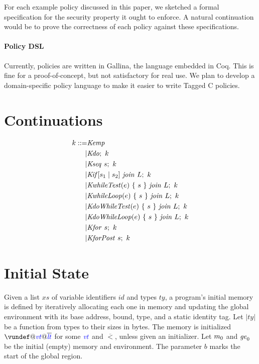 \documentclass[acmsmall,review,anonymous]{acmart}\settopmatter{printfolios=true,printccs=false,printacmref=false}
\begin{document}
For each example policy discussed in this paper, we sketched a formal specification for the
security property it ought to enforce. A natural continuation would be to prove the correctness
of each policy against these specifications.

\paragraph{Policy DSL}

Currently, policies are written in Gallina, the language embedded in Coq. This is fine for a
proof-of-concept, but not satisfactory for real use. We plan to develop a domain-specific policy
language to make it easier to write Tagged C policies.



\appendix

\section{Continuations}
\label{app:continuations}

\[\begin{split}
k ::= & \mathit{Kemp} \\
| & \mathit{Kdo};~ k \\
| & \mathit{Kseq} ~ s; ~ k \\
| & \mathit{Kif}[s_1 \mid s_2] ~ \mathit{join} ~ L; ~ k \\
| & \mathit{KwhileTest}(e) ~ \{ ~ s ~ \} ~ \mathit{join} ~ L; ~ k \\
| & \mathit{KwhileLoop}(e) ~ \{ ~ s ~ \} ~ \mathit{join} ~ L; ~ k \\
| & \mathit{KdoWhileTest}(e) ~ \{ ~ s ~ \} ~ \mathit{join} ~ L; ~ k \\
| & \mathit{KdoWhileLoop}(e) ~ \{ ~ s ~ \} ~ \mathit{join} ~ L; ~ k \\
| & \mathit{Kfor} ~ s; ~ k \\
| & \mathit{KforPost} ~ s; ~ k \\
\end{split}\]

\section{Initial State}

Given a list \(xs\) of variable identifiers \(id\) and types
\(ty\), a program's initial memory is defined by iteratively allocating each one
in memory and updating the global environment with its base address, bound, type,
and a static identity tag. Let \(|ty|\) be a function from types to their sizes
in bytes. The memory is initialized \(\vundef@\vt@\overline{\lt}\)
for some \(\mathit{\color{blue} vt}\) and \(\overline{\lt}\), unless given an initializer.
Let \(m_0\) and \(\mathit{ge}_0\) be the initial (empty) memory and environment.
The parameter \(b\) marks the start of the global region.
\end{document}
